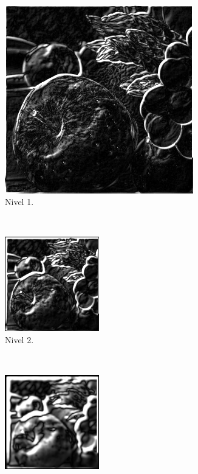 \documentclass[12pt, letterpaper]{article}
\begin{document}
\begin{figure}[H]
  \centering
  \begin{subfigure}[t]{0.48\textwidth}
    \centering
    \includegraphics[width = 0.9\textwidth]{frutas/lp1.png}
    \caption{Nivel 1.}
  \end{subfigure}
  ~ 
  \begin{subfigure}[t]{0.48\textwidth}
      \centering
      \includegraphics[width = 0.45\textwidth]{frutas/lp2.png}
      \caption{Nivel 2.}
  \end{subfigure}
  ~ 
  \begin{subfigure}[t]{0.32\textwidth}
      \centering
      \includegraphics[width = 0.45\textwidth]{frutas/lp3.png}

\end{subfigure}
\end{figure}
\end{document}
